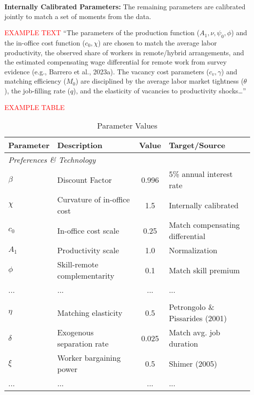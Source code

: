 \documentclass[
  11pt,
  letterpaper,
  DIV=11,
  numbers=noendperiod]{scrartcl}
\begin{document}
\textbf{Internally Calibrated Parameters:} The remaining parameters are
calibrated jointly to match a set of moments from the data.

\textcolor{red}{EXAMPLE TEXT} ``The parameters of the production
function (\(A_1, \nu, \psi_0, \phi\)) and the in-office cost function
(\(c_0, \chi\)) are chosen to match the average labor productivity, the
observed share of workers in remote/hybrid arrangements, and the
estimated compensating wage differential for remote work from survey
evidence (e.g., Barrero et al., 2023a). The vacancy cost parameters
(\(c_v, \gamma\)) and matching efficiency (\(M_0\)) are disciplined by
the average labor market tightness (\(\theta\)), the job-filling rate
(\(q\)), and the elasticity of vacancies to productivity
shocks\ldots{}''

\textcolor{red}{EXAMPLE TABLE}

\begin{table}[h!]
\centering
\caption{Parameter Values}

\begin{tabular}{@{}llcl@{}}
\toprule
\textbf{Parameter} & \textbf{Description} & \textbf{Value} & \textbf{Target/Source} \\
\midrule
\multicolumn{4}{l}{\textit{Preferences \& Technology}} \\
$\beta$ & Discount Factor & 0.996 & 5\% annual interest rate \\
$\chi$ & Curvature of in-office cost & 1.5 & Internally calibrated \\
$c_0$ & In-office cost scale & 0.25 & Match compensating differential \\
$A_1$ & Productivity scale & 1.0 & Normalization \\
$\phi$ & Skill-remote complementarity & 0.1 & Match skill premium \\
... & ... & ... & ... \\
\addlinespace %
\multicolumn{4}{l}{\textit{Search \& Matching}} \\
$\eta$ & Matching elasticity & 0.5 & Petrongolo \& Pissarides (2001) \\
$\delta$ & Exogenous separation rate & 0.025 & Match avg. job duration \\
$\xi$ & Worker bargaining power & 0.5 & Shimer (2005) \\
... & ... & ... & ... \\
\bottomrule
\end{tabular}
\end{table}
\end{document}
